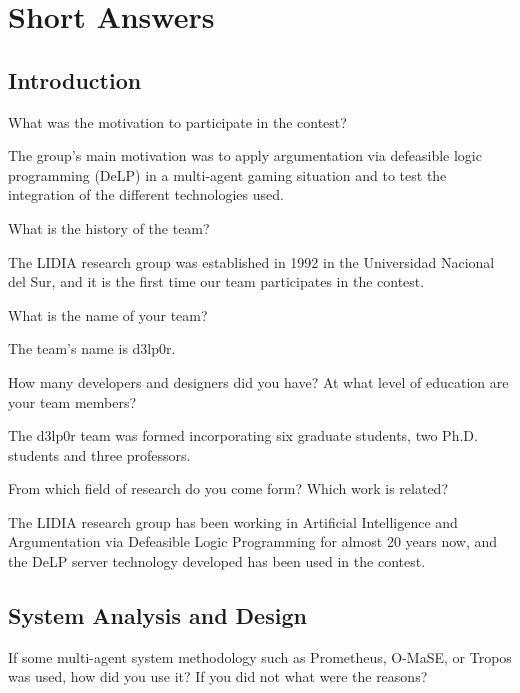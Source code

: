 
\section{Short Answers}


\subsection{Introduction}

\begin{question}
What was the motivation to participate in the contest?  
\end{question}

The group's main motivation was to apply argumentation via defeasible 
logic programming (DeLP) in a multi-agent gaming situation and to test the
integration of the different technologies used.

\begin{question}
What is the history of the team?  
\end{question}

The LIDIA research group was established in 1992 in the Universidad 
Nacional del Sur, and it is the first time our team participates in the 
contest.

\begin{question}
What is the name of your team?  
\end{question}

The team's name is d3lp0r.

\begin{question}
How many developers and designers did you have?  At what level of education
are your team members?  
\end{question}

The d3lp0r team was formed incorporating six graduate
students, two Ph.D. students and three professors.

\begin{question}
From which field of research do you come form?  Which work is related?  
\end{question}

The LIDIA research group has been working in Artificial Intelligence and
Argumentation via Defeasible Logic Programming for almost 20 years now, and
the DeLP server technology developed has been used in the contest.

\subsection{System Analysis and Design}
\setcounter{question}{0}
\begin{question}
If some multi-agent system methodology such
as Prometheus, O-MaSE, or Tropos was used, how did you use it? If you did not
what were the reasons?  
\end{question}


